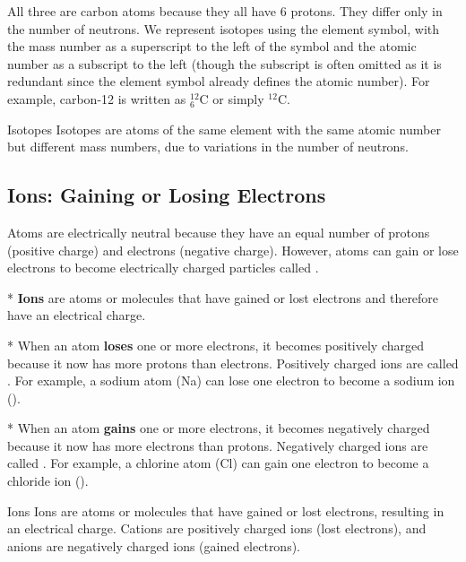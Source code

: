 All three are carbon atoms because they all have 6 protons.  They differ only in the number of neutrons. We represent isotopes using the element symbol, with the mass number as a superscript to the left of the symbol and the atomic number as a subscript to the left (though the subscript is often omitted as it is redundant since the element symbol already defines the atomic number).  For example, carbon-12 is written as $^{12}_{6}\text{C}$ or simply $^{12}\text{C}$.

\begin{keyconcept}{Isotopes}
Isotopes are atoms of the same element with the same atomic number but different mass numbers, due to variations in the number of neutrons.
\end{keyconcept}

\subsection{Ions: Gaining or Losing Electrons}


Atoms are electrically neutral because they have an equal number of protons (positive charge) and electrons (negative charge). However, atoms can gain or lose electrons to become electrically charged particles called .

* \textbf{Ions} are atoms or molecules that have gained or lost electrons and therefore have an electrical charge.

* When an atom \textbf{loses} one or more electrons, it becomes positively charged because it now has more protons than electrons. Positively charged ions are called . For example, a sodium atom (Na) can lose one electron to become a sodium ion ().

* When an atom \textbf{gains} one or more electrons, it becomes negatively charged because it now has more electrons than protons. Negatively charged ions are called . For example, a chlorine atom (Cl) can gain one electron to become a chloride ion ().

\begin{keyconcept}{Ions}
Ions are atoms or molecules that have gained or lost electrons, resulting in an electrical charge.  Cations are positively charged ions (lost electrons), and anions are negatively charged ions (gained electrons).
\end{keyconcept}

